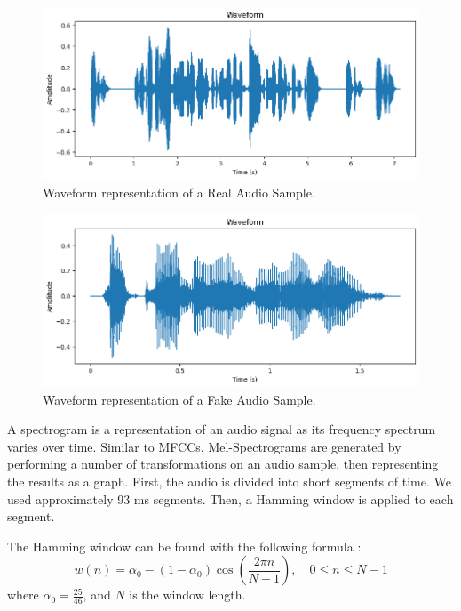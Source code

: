 \documentclass[conference]{IEEEtran}
\begin{document}
\begin{figure}
  \centering
  \includegraphics[width=\linewidth]{images/real_waveform.png}
  \caption{Waveform representation of a Real Audio Sample.}
  \label{fig:real_waveform}
\end{figure}

\begin{figure}
  \centering
  \includegraphics[width=\linewidth]{images/fake_waveform.png}
  \caption{Waveform representation of a Fake Audio Sample.}
  \label{fig:fake_waveform}
\end{figure}

A spectrogram is a representation of an audio signal as its frequency spectrum varies over time. Similar to MFCCs, Mel-Spectrograms are generated by performing a number of transformations on an audio sample, then representing the results as a graph. First, the audio is divided into short segments of time. We used approximately 93 ms segments. Then, a Hamming window is applied to each segment.

The Hamming window can be found with the following formula \cite{9252126}:
\begin{equation}
w(n) = \alpha_0 - (1 - \alpha_0) \cos\left(\frac{2\pi n}{N-1}\right), \quad 0 \leq n \leq N-1
\end{equation}
where \(\alpha_0 = \frac{25}{46}\), and \(N\) is the window length.
\end{document}
